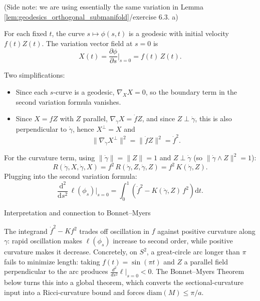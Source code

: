 (Side note: we are using essentially the same variation in Lemma \ref{lem:geodesics_orthogonal_submanifold}/exercise 6.3. a)


For each fixed $t$, the curve $s \mapsto \phi(s, t)$ is a geodesic with initial velocity $f(t) Z(t)$. The variation vector field at $s = 0$ is
\[
X(t) = \frac{\partial \phi}{\partial s}\bigg|_{s = 0} = f(t)\, Z(t).
\]

Two simplifications:
\begin{itemize}
    \item Since each $s$-curve is a geodesic, $\nabla_X X = 0$, so the boundary term in the second variation formula vanishes.
    \item Since $X = f Z$ with $Z$ parallel, $\nabla_{\dot\gamma} X = \dot f Z$, and since $Z \perp \dot\gamma$, this is also perpendicular to $\dot\gamma$, hence $X^\perp = X$ and
    \[
    \|\nabla_{\dot\gamma} X^\perp\|^2 = \|\dot f Z\|^2 = \dot f^2.
    \]
\end{itemize}
For the curvature term, using $\|\dot\gamma\| = \|Z\| = 1$ and $Z \perp \dot\gamma$ (so $\|\dot\gamma \wedge Z\|^2 = 1$):
\[
R(\dot\gamma, X, \dot\gamma, X) = f^2\, R(\dot\gamma, Z, \dot\gamma, Z) = f^2\, K(\dot\gamma, Z).
\]
Plugging into the second variation formula:
\begin{equation}
    \label{eq:second-variation-special-case}
    \frac{\mathrm{d}^2}{\mathrm{d}s^2}\,\ell(\phi_s)\bigg|_{s = 0} = \int_0^1 \!\left(\dot f^2 - K(\dot\gamma, Z)\, f^2\right) \mathrm{d}t.
\end{equation}

\begin{colremark}{Interpretation and connection to Bonnet--Myers}{}

    The integrand $\dot f^2 - K f^2$ trades off oscillation in $f$ against positive curvature along $\gamma$: rapid oscillation makes $\ell(\phi_s)$ increase to second order, while positive curvature makes it decrease. Concretely, on $S^2$, a great-circle arc longer than $\pi$ fails to minimize length: taking $f(t) = \sin(\pi t)$ and $Z$ a parallel field perpendicular to the arc produces $\frac{d^2}{ds^2}\ell|_{s=0} < 0$. The Bonnet--Myers Theorem below turns this into a global theorem, which converts the sectional-curvature input into a Ricci-curvature bound and forces $\mathrm{diam}(M) \leqslant \pi/a$.
\end{colremark}




